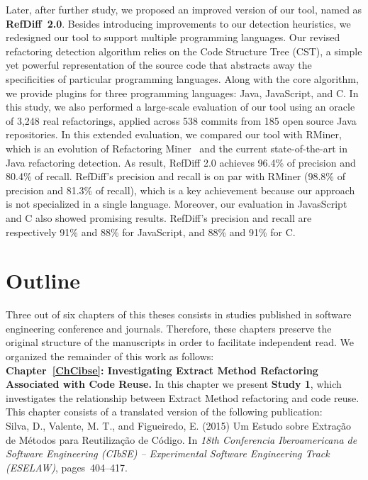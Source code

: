Later, after further study, we proposed an improved version of our tool, named as \textbf{RefDiff~2.0}.
Besides introducing improvements to our detection heuristics, we redesigned our tool to support multiple programming languages. Our revised refactoring detection algorithm relies on the Code Structure Tree (CST), a simple yet powerful representation of the source code that abstracts away the specificities of particular programming languages.
Along with the core algorithm, we provide plugins for three programming languages: Java, JavaScript, and C.
In this study, we also performed a large-scale evaluation of our tool using an  oracle of 3,248 real refactorings, applied across 538 commits from 185 open source Java repositories.
In this extended evaluation, we compared our tool with RMiner, which is an evolution of Refactoring Miner~\citep{tsantalis2018rminer} and the current state-of-the-art in Java refactoring detection.
As result, RefDiff 2.0 achieves 96.4\% of precision and 80.4\% of recall.
RefDiff's precision and recall is on par with RMiner (98.8\% of precision and 81.3\% of recall), which is a key achievement because our approach is not specialized in a single language.
Moreover, our  evaluation  in  JavasScript  and  C  also showed promising results. RefDiff’s precision and recall are respectively 91\% and 88\% for JavaScript, and 88\% and 91\% for C.





\section{Outline}
\label{SecOutline}

Three out of six chapters of this theses consists in studies published in software engineering conference and journals.
Therefore, these chapters preserve the original structure of the manuscripts in order to facilitate independent read.
We organized the remainder of this work as follows:
\\[6pt]

\noindent\textbf{Chapter~\ref{ChCibse}: Investigating Extract Method Refactoring Associated with Code Reuse.} In this chapter we present \textbf{Study 1}, which investigates the relationship between Extract Method refactoring and code reuse. This chapter consists of a translated version of the following publication:
\\[6pt]
\noindent Silva, D., Valente, M. T., and Figueiredo, E. (2015) Um Estudo sobre Extração de Métodos para Reutilização de Código. In \emph{18th Conferencia Iberoamericana de Software Engineering (CIbSE) -- Experimental Software Engineering Track (ESELAW)}, pages~404--417.
\\[6pt]

